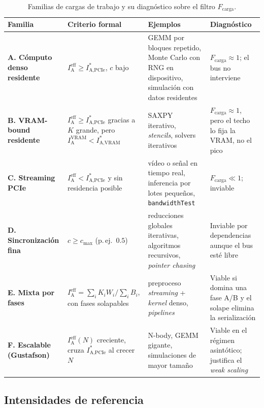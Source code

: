 \documentclass[a4paper,11pt]{article}
\begin{document}
\begin{table}[t]
\centering
\footnotesize
\caption{Familias de cargas de trabajo y su diagnóstico sobre el filtro $F_{\text{carga}}$.}
\label{tab:familias}
\begin{tabular}{>{\raggedright\arraybackslash}p{2.3cm} >{\raggedright\arraybackslash}p{4.5cm} >{\raggedright\arraybackslash}p{4.0cm} >{\raggedright\arraybackslash}p{3.4cm}}
\toprule
\textbf{Familia} & \textbf{Criterio formal} & \textbf{Ejemplos} & \textbf{Diagnóstico} \\
\midrule
\textbf{A. Cómputo denso residente} & $I_{\text{A}}^{\text{eff}} \ge I_{\text{A,PCIe}}^*$, $c$ bajo & GEMM por bloques repetido, Monte Carlo con RNG en dispositivo, simulación con datos residentes & $F_{\text{carga}} \approx 1$; el bus no interviene \\
\textbf{B. VRAM-bound residente} & $I_{\text{A}}^{\text{eff}} \ge I_{\text{A,PCIe}}^*$ gracias a $K$ grande, pero $I_{\text{A}}^{\text{VRAM}} < I_{\text{A,VRAM}}^*$ & SAXPY iterativo, \textit{stencils}, solvers iterativos & $F_{\text{carga}} \approx 1$, pero el techo lo fija la VRAM, no el pico \\
\textbf{C. Streaming PCIe} & $I_{\text{A}}^{\text{eff}} < I_{\text{A,PCIe}}^*$ y sin residencia posible & vídeo o señal en tiempo real, inferencia por lotes pequeños, \texttt{bandwidthTest} & $F_{\text{carga}} \ll 1$; inviable \\
\textbf{D. Sincronización fina} & $c \ge c_{\max}$ (p.\,ej.\ $0.5$) & reducciones globales iterativas, algoritmos recursivos, \textit{pointer chasing} & Inviable por dependencias aunque el bus esté libre \\
\textbf{E. Mixta por fases} & $I_{\text{A}}^{\text{eff}} = \sum_i K_i W_i / \sum_i B_i$, con fases solapables & preproceso \textit{streaming} + \textit{kernel} denso, \textit{pipelines} & Viable si domina una fase A/B y el solape elimina la serialización \\
\textbf{F. Escalable (Gustafson)} & $I_{\text{A}}^{\text{eff}}(N)$ creciente, cruza $I_{\text{A,PCIe}}^*$ al crecer $N$ & N-body, GEMM gigante, simulaciones de mayor tamaño & Viable en el régimen asintótico; justifica el \textit{weak scaling} \\
\bottomrule
\end{tabular}
\end{table}

\subsection{Intensidades de referencia}
\end{document}
